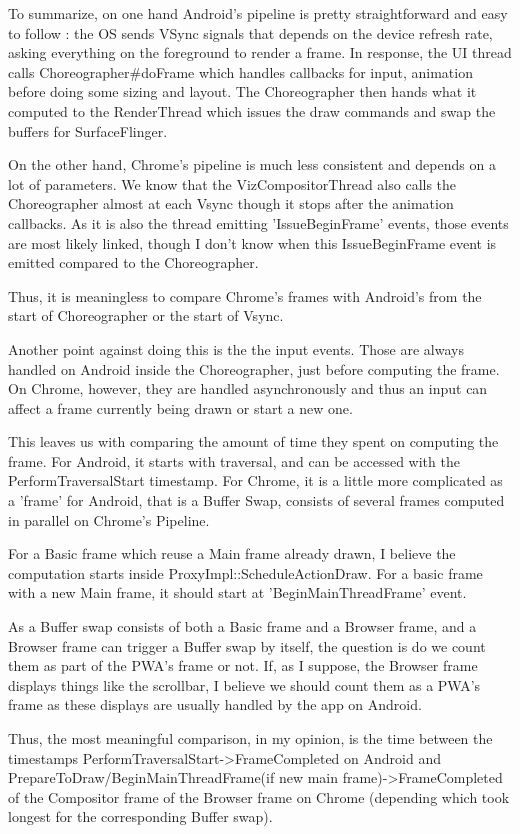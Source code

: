 \documentclass{kththesis}
\begin{document}
To summarize, on one hand Android's pipeline is pretty straightforward and easy to follow : the OS sends VSync signals that depends on the device refresh rate, asking everything on the foreground to render a frame. In response, the UI thread calls Choreographer\#doFrame which handles callbacks for input, animation before doing some sizing and layout. The Choreographer then hands what it computed to the RenderThread which issues the draw commands and swap the buffers for SurfaceFlinger.

On the other hand, Chrome's pipeline is much less consistent and depends on a lot of parameters. We know that the VizCompositorThread also calls the Choreographer almost at each Vsync though it stops after the animation callbacks. As it is also the thread emitting 'IssueBeginFrame' events, those events are most likely linked, though I don't know when this IssueBeginFrame event is emitted compared to the Choreographer.

Thus, it is meaningless to compare Chrome's frames with Android's from the start of Choreographer or the start of Vsync.

Another point against doing this is the the input events. Those are always handled on Android inside the Choreographer, just before computing the frame. On Chrome, however, they are handled asynchronously and thus an input can affect a frame currently being drawn or start a new one.

This leaves us with comparing the amount of time they spent on computing the frame. For Android, it starts with traversal, and can be accessed with the PerformTraversalStart timestamp. For Chrome, it is a little more complicated as a 'frame' for Android, that is a Buffer Swap, consists of several frames computed in parallel on Chrome's Pipeline.

For a Basic frame which reuse a Main frame already drawn, I believe the computation starts inside ProxyImpl::ScheduleActionDraw. For a basic frame with a new Main frame, it should start at 'BeginMainThreadFrame' event. 

As a Buffer swap consists of both a Basic frame and a Browser frame, and a Browser frame can trigger a Buffer swap by itself, the question is do we count them as part of the PWA's frame or not. If, as I suppose, the Browser frame displays things like the scrollbar, I believe we should count them as a PWA's frame as these displays are usually handled by the app on Android. 

Thus, the most meaningful comparison, in my opinion, is the time between the timestamps PerformTraversalStart->FrameCompleted on Android and PrepareToDraw/BeginMainThreadFrame(if new main frame)->FrameCompleted of the Compositor frame of the Browser frame on Chrome (depending which took longest for the corresponding Buffer swap).
\end{document}
